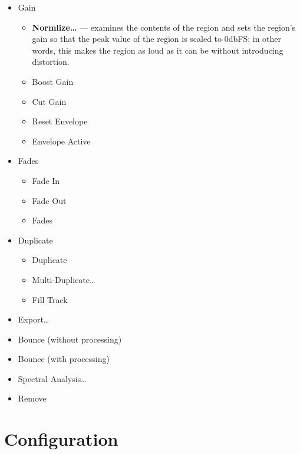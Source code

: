 \documentclass[10pt,a4paper]{book}
\begin{document}
{\begin{itemize}
\begin{itemize}
\item Set Loop Range
\item Set Punch
\item Add Single Range Marker
\item Add Range Marker Per Region
\item Set Range Selection
\end{itemize}
\item Gain
\begin{itemize}
\item \textbf{Normlize\ldots} --- examines the contents of the region
  and sets the region's gain so that the peak value of the region is
  scaled to 0dbFS; in other words, this makes the region as loud as it
  can be without introducing distortion.
\item Boost Gain
\item Cut Gain
\item Reset Envelope
\item Envelope Active
\end{itemize}
\item Fades
\begin{itemize}
\item Fade In
\item Fade Out
\item Fades
\end{itemize}
\item Duplicate
\begin{itemize}
\item Duplicate
\item Multi-Duplicate\ldots
\item Fill Track
\end{itemize}
\item Export\ldots
\item Bounce (without processing)
\item Bounce (with processing)
\item Spectral Analysis\ldots
\item Remove
\end{itemize}







\chapter{Configuration}

}
\end{document}
